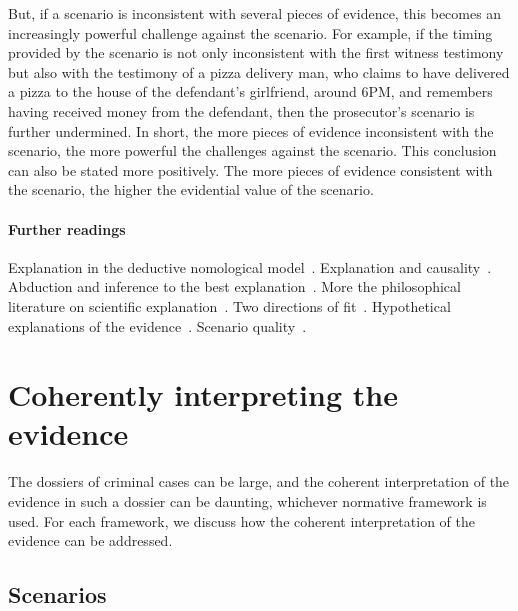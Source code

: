 \documentclass[10pt]{article}
\begin{document}
But, if a scenario is inconsistent with several pieces of evidence, this becomes an increasingly powerful challenge against the scenario. 
For example, if the timing provided by the scenario is not only inconsistent 
with the first witness testimony but also with the testimony of a pizza delivery man, 
who claims to have delivered a pizza to the house of the defendant's girlfriend, around 6PM, and remembers having received money 
from the defendant, then the prosecutor's scenario is further undermined. In short, the more pieces of evidence 
inconsistent with the scenario, the more powerful the challenges against the scenario.
This conclusion can also be stated more positively. The more pieces of evidence consistent with the scenario, 
the higher the evidential value of the scenario.







\paragraph{Further readings}

Explanation in the deductive nomological model~\citep{hempelOppenhaim1948}. 
Explanation and causality~\citep{salmon1984}. 
Abduction and inference to the best explanation~\citep{lipton1991}.
More the philosophical literature on 
scientific explanation~\citep{woodward2014}. 
Two directions of fit~\citep{wells1992}.
Hypothetical explanations of the evidence~\citep{thagard1989}. 
Scenario quality~\citep{penningtonHastie1993,wagenaarEtal1993,bex2011}.


\section{Coherently interpreting the evidence}
\label{sec:cohint}

The dossiers of criminal cases can be large, and the coherent interpretation of the evidence in such a dossier can 
be daunting, whichever normative framework is used. For each framework, we discuss how the coherent 
interpretation of the evidence can be addressed.

\subsection{Scenarios}
\end{document}

